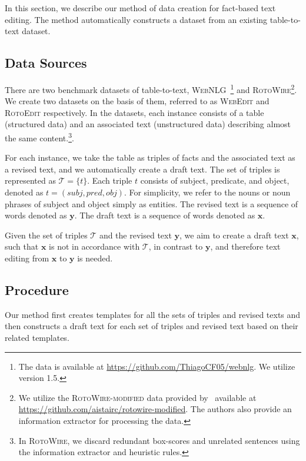 \documentclass[11pt,a4paper]{article}
\begin{document}
In this section, we describe our method of data creation for fact-based text editing. The method automatically constructs a dataset from an existing table-to-text dataset. 

\subsection{Data Sources}
There are two benchmark datasets of table-to-text, \textsc{WebNLG}~\cite{gardent-etal-2017-creating}\footnote{The data is available at \url{https://github.com/ThiagoCF05/webnlg}. We utilize version 1.5.} and \textsc{RotoWire}\cite{wiseman2017challenges}\footnote{We utilize the \textsc{RotoWire-modified} data provided by~\citet{iso2019learning} available at \url{https://github.com/aistairc/rotowire-modified}. The authors also provide an information extractor for processing the data.}. We create two datasets on the basis of them, referred to as \textsc{WebEdit} and \textsc{RotoEdit} respectively. In the datasets, each instance consists of a table (structured data) and an associated text (unstructured data) describing almost the same content.\footnote{In \textsc{RotoWire}, we discard redundant box-scores and unrelated sentences using the information extractor and heuristic rules. }.  

For each instance, we take the table as triples of facts and the associated text as a revised text, and we automatically create a draft text. The set of triples is represented as $\mathcal{T} = \{t\}$. Each triple $t$ consists of subject, predicate, and object, denoted as $t = (subj, pred, obj)$. For simplicity, we refer to the nouns or noun phrases of subject and object simply as entities. The revised text is a sequence of words denoted as $\boldsymbol{y}$. The draft text is a sequence of words denoted as $\boldsymbol{x}$. 

Given the set of triples $\mathcal{T}$ and the revised text $\boldsymbol{y}$, we aim to create a draft text $\boldsymbol{x}$, such that $\boldsymbol{x}$ is not in accordance with $\mathcal{T}$, in contrast to $\boldsymbol{y}$, and therefore text editing from $\boldsymbol{x}$ to $\boldsymbol{y}$ is needed.

\subsection{Procedure}

Our method first creates templates for all the sets of triples and revised texts and then constructs a draft text for each set of triples and revised text based on their related templates.
\end{document}
